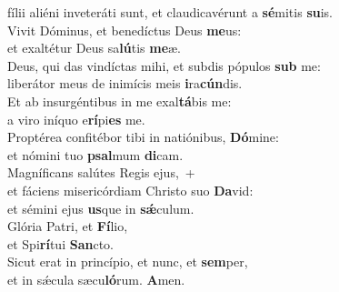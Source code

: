 \oddverse fílii aliéni inveteráti sunt, et claudicavérunt a \textbf{sé}mitis \textbf{su}is.\\
\evenverse Vivit Dóminus, et benedíctus Deus \textbf{me}us:~\*\\
\evenverse et exaltétur Deus sa\textbf{lú}tis \textbf{me}æ.\\
\oddverse Deus, qui das vindíctas mihi, et subdis pópulos \textbf{sub} me:~\*\\
\oddverse liberátor meus de inimícis meis \textbf{i}ra\textbf{cún}dis.\\
\evenverse Et ab insurgéntibus in me exal\textbf{tá}bis me:~\*\\
\evenverse a viro iníquo e\textbf{rí}pi\textbf{es} me.\\
\oddverse Proptérea confitébor tibi in natiónibus, \textbf{Dó}mine:~\*\\
\oddverse et nómini tuo \textbf{psal}mum \textbf{di}cam.\\
\evenverse Magníficans salútes Regis ejus,~+\\
\evenverse  et fáciens misericórdiam Christo suo \textbf{Da}vid:~\*\\
\evenverse et sémini ejus \textbf{us}que in \textbf{sǽ}culum.\\
\oddverse Glória Patri, et \textbf{Fí}lio,~\*\\
\oddverse et Spi\textbf{rí}tui \textbf{San}cto.\\
\evenverse Sicut erat in princípio, et nunc, et \textbf{sem}per,~\*\\
\evenverse et in sǽcula sæcu\textbf{ló}rum. \textbf{A}men.\\
